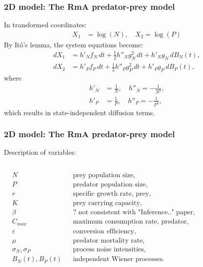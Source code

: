 \begin{frame}
    \frametitle{2D model: The RmA predator-prey model}
    In transformed coordinates:
    \begin{align*}
        X_1 &= \log(N), \quad X_2 = \log(P) 
    \end{align*}
    By It\^o's lemma, the system equations become:
    \begin{subequations}
        \begin{align}
            dX_1 &= h'_N f_N\,dt + \frac{1}{2} h''_N g_N^2\,dt + h'_N g_N\,dB_N(t), \\
            dX_2 &= h'_P f_P\,dt + \frac{1}{2} h''_P g_P^2\,dt + h'_P g_P\,dB_P(t),    
        \end{align}
    \end{subequations}
    where 
    \begin{subequations}
        \begin{align}
            h'_N &= \frac{1}{N}, \quad h''_N = -\frac{1}{N^2}, \\
            h'_P &= \frac{1}{P}, \quad h''_P = -\frac{1}{P^2},
        \end{align}
    \end{subequations}
    which results in state-independent diffusion terms.
\end{frame}

\begin{frame}
    \frametitle{2D model: The RmA predator-prey model}
    Description of variables:
    \begin{columns}
        \begin{align*}
            &N &&\text{prey population size}, \\
            &P &&\text{predator population size}, \\
            &r &&\text{specific growth rate, prey}, \\
            &K &&\text{prey carrying capacity}, \\
            &\beta &&\text{? not consistent with "Inference.." paper}, \\
            &C_{max} &&\text{maximum consumption rate, predator}, \\
            &\varepsilon &&\text{conversion efficiency}, \\
            &\mu &&\text{predator mortality rate}, \\
            &\sigma_N, \sigma_P &&\text{process noise intensities}, \\
            &B_N(t), B_P(t) &&\text{independent Wiener processes}.
        \end{align*}
    \end{columns}
\end{frame}

